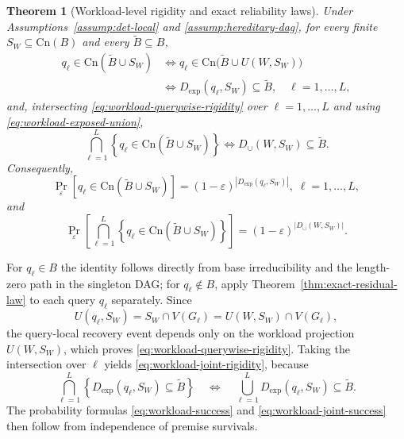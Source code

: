 \documentclass[journal]{IEEEtran}
\makeatletter
\newcommand{\Cn}{\text{Cn}}
\newtheorem{theorem}{Theorem}[section]
\numberwithin{equation}{section}
\renewenvironment{proof}[1][\proofname]{\par
  \pushQED{\qed}%
  \normalfont \topsep6\p@\@plus6\p@\relax
  \trivlist
  \item[\hskip\labelsep
        \itshape
    #1\@addpunct{.}]\ignorespaces
}{%
  \popQED\endtrivlist\@endpefalse
}
\makeatother
\begin{document}
\begin{theorem}[Workload-level rigidity and exact reliability laws]
\label{thm:workload-rigidity}
Under Assumptions~\ref{assump:det-local} and
\ref{assump:hereditary-dag}, for every finite
\(S_W\subseteq\Cn(B)\) and every \(\widetilde B\subseteq B\),
\begin{align}
  q_\ell\in\Cn(\widetilde B\cup S_W)
  &\Longleftrightarrow
  q_\ell\in\Cn\bigl(\widetilde B\cup U(W,S_W)\bigr)
  \nonumber\\
  &\Longleftrightarrow
  D_{\mathrm{exp}}(q_\ell,S_W)\subseteq\widetilde B,
  \quad \ell=1,\ldots,L,
\label{eq:workload-querywise-rigidity}
\end{align}
and, intersecting \eqref{eq:workload-querywise-rigidity} over
\(\ell=1,\ldots,L\) and using \eqref{eq:workload-exposed-union},
\begin{equation}
  \bigcap_{\ell=1}^{L}
  \left\{
    q_\ell\in\Cn(\widetilde B\cup S_W)
  \right\}
  \Longleftrightarrow
  D_{\cup}(W,S_W)\subseteq\widetilde B.
\label{eq:workload-joint-rigidity}
\end{equation}
Consequently,
\begin{equation}
  \Pr_\varepsilon\!\left[
    q_\ell\in\Cn(\widetilde B\cup S_W)
  \right]
  =
  (1-\varepsilon)^{|D_{\mathrm{exp}}(q_\ell,S_W)|},
  \; \ell=1,\ldots,L,
\label{eq:workload-success}
\end{equation}
and
\begin{equation}
  \Pr_\varepsilon\!\left[
    \bigcap_{\ell=1}^{L}
    \left\{
      q_\ell\in\Cn(\widetilde B\cup S_W)
    \right\}
  \right]
  =
  (1-\varepsilon)^{|D_{\cup}(W,S_W)|}.
\label{eq:workload-joint-success}
\end{equation}
\end{theorem}

\begin{proof}
For \(q_\ell\in B\) the identity follows directly from base
irreducibility and the length-zero path in the singleton DAG; for
\(q_\ell\notin B\), apply Theorem~\ref{thm:exact-residual-law} to each
query \(q_\ell\) separately.  Since
\[
  U(q_\ell,S_W)=S_W\cap V(G_\ell)=U(W,S_W)\cap V(G_\ell),
\]
the query-local recovery event depends only on the workload projection
\(U(W,S_W)\), which proves \eqref{eq:workload-querywise-rigidity}.  Taking the
intersection over \(\ell\) yields
\eqref{eq:workload-joint-rigidity}, because
\[
  \bigcap_{\ell=1}^{L}
  \left\{
    D_{\mathrm{exp}}(q_\ell,S_W)\subseteq\widetilde B
  \right\}
  \quad\Longleftrightarrow\quad
  \bigcup_{\ell=1}^{L}
  D_{\mathrm{exp}}(q_\ell,S_W)\subseteq\widetilde B.
\]
The probability formulas \eqref{eq:workload-success} and
\eqref{eq:workload-joint-success} then follow from independence of premise
survivals.
\end{proof}
\end{document}
